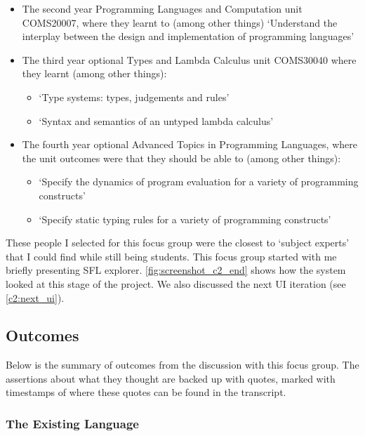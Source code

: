 \begin{itemize}
    \item The second year Programming Languages and Computation unit COMS20007, where they learnt to (among other things) `Understand the interplay between the design and implementation of programming languages' \cite{COMS20007_PLC}
    \item The third year optional Types and Lambda Calculus unit COMS30040 where they learnt (among other things): \cite{COMS30040_TLC} 
    \begin{itemize}
        \item `Type systems: types, judgements and rules'
        \item `Syntax and semantics of an untyped lambda calculus'
    \end{itemize}
    \item The fourth year optional Advanced Topics in Programming Languages, where the unit outcomes were that they should be able to (among other things): \cite{COMSM0067_ATPL}
    \begin{itemize}
        \item `Specify the dynamics of program evaluation for a variety of programming constructs'
        \item `Specify static typing rules for a variety of programming constructs'
    \end{itemize}
\end{itemize}

These people I selected for this focus group were the closest to `subject experts' that I could find while still being students. 
This focus group started with me briefly presenting SFL explorer. \ref{fig:screenshot_c2_end} shows how the system looked at this stage of the project. We also discussed the next UI iteration (see \ref{c2:next_ui}). 

\subsection{Outcomes}
Below is the summary of outcomes from the discussion with this focus group. The assertions about what they thought are backed up with quotes, marked with timestamps of where these quotes can be found in the transcript. 

\subsubsection{The Existing Language}

